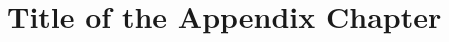     
\setcounter{chapter}{-1}
\chapter{Title of the Appendix Chapter}
\renewcommand{\thechapter}{A}
\label{chap:appendix-vector}
\setcounter{section}{0}
\setcounter{theorem}{0}
\renewcommand{\thetheorem}{\thechapter.\arabic{theorem}}
\setcounter{equation}{0}
\renewcommand{\theequation}{\thechapter.\arabic{equation}}
\setcounter{figure}{0}
\renewcommand{\thefigure}{\thechapter.\arabic{figure}}
\setcounter{table}{0}

\lipsum[1-5]
